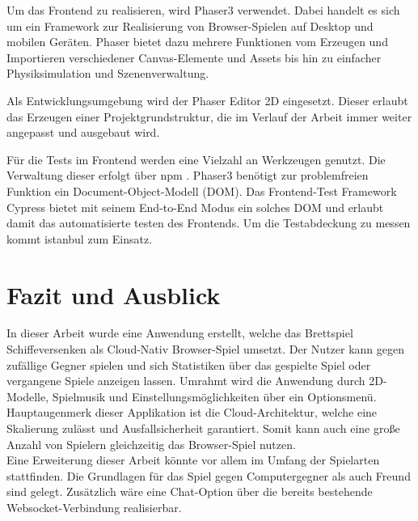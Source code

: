 \documentclass[a4paper, 10pt, conference]{IEEEtran}
\begin{document}
Um das Frontend zu realisieren, wird Phaser3 \cite{phaser} verwendet. Dabei handelt es sich um ein Framework zur Realisierung von Browser-Spielen auf Desktop und mobilen Geräten. Phaser bietet dazu mehrere Funktionen vom Erzeugen und Importieren verschiedener Canvas-Elemente und Assets bis hin zu einfacher Physiksimulation und Szenenverwaltung.

Als Entwicklungsumgebung wird der Phaser Editor 2D eingesetzt. Dieser erlaubt das Erzeugen einer Projektgrundstruktur, die im Verlauf der Arbeit immer weiter angepasst und ausgebaut wird.  

Für die Tests im Frontend werden eine Vielzahl an Werkzeugen genutzt. Die Verwaltung dieser erfolgt über npm \cite{npm}. Phaser3 benötigt zur problemfreien Funktion ein Document-Object-Modell (DOM). Das Frontend-Test Framework Cypress \cite{cypress} bietet mit seinem End-to-End Modus ein solches DOM und erlaubt damit das automatisierte testen des Frontends. Um die Testabdeckung zu messen kommt istanbul \cite{istanbul} zum Einsatz.



\section{Fazit und Ausblick}\label{sec:fazit}
In dieser Arbeit wurde eine Anwendung erstellt, welche das Brettspiel Schiffeversenken als Cloud-Nativ Browser-Spiel umsetzt. Der Nutzer kann gegen zufällige Gegner spielen und sich Statistiken über das gespielte Spiel oder vergangene Spiele anzeigen lassen. Umrahmt wird die Anwendung durch 2D-Modelle, Spielmusik und Einstellungsmöglichkeiten über ein Optionsmenü. Hauptaugenmerk dieser Applikation ist die Cloud-Architektur, welche eine Skalierung zulässt und Ausfallsicherheit garantiert. Somit kann auch eine große Anzahl von Spielern gleichzeitig das Browser-Spiel nutzen.\\
Eine Erweiterung dieser Arbeit könnte vor allem im Umfang der Spielarten stattfinden. Die Grundlagen für das Spiel gegen Computergegner als auch Freund sind gelegt. Zusätzlich wäre eine Chat-Option über die bereits bestehende Websocket-Verbindung realisierbar. \\



\printbibliography
\end{document}
